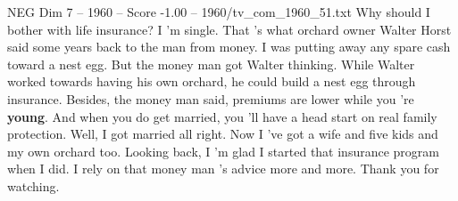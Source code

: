 \begin{textsample}{NEG Dim 7 – 1960 – Score -1.00 – 1960/tv\_com\_1960\_51.txt}  \label{ex:f7_neg_071}
Why should I bother with life insurance?
I 'm single.
That 's what orchard owner Walter Horst said some years back to the man from money.
I was putting away any spare cash toward a nest egg.
But the money man got Walter thinking.
While Walter worked towards having his own orchard, he could build a nest egg through insurance.
Besides, the money man said, premiums are lower while you 're \textbf{young}.
And when you do get married, you 'll have a head start on real family protection.
Well, I got married all right.
Now I 've got a wife and five kids and my own orchard too.
Looking back, I 'm glad I started that insurance program when I did.
I rely on that money man 's advice more and more.
Thank you for watching.

\end{textsample}
